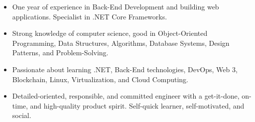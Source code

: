 


\begin{itemize}
    \item One year of experience in Back-End Development and building web applications. Specialist in .NET Core Frameworks.
    \item Strong knowledge of computer science, good in Object-Oriented Programming, Data Structures, Algorithms, Database Systems, Design Patterns, and Problem-Solving.
    \item Passionate about learning .NET, Back-End technologies, DevOps, Web 3, Blockchain, Linux, Virtualization, and Cloud Computing.
    \item Detailed-oriented, responsible, and committed engineer with a get-it-done, on-time, and high-quality product spirit. Self-quick learner, self-motivated, and social.
\end{itemize}

